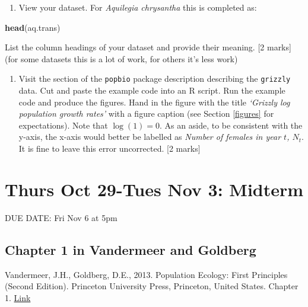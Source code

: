 \documentclass[]{book}
\newenvironment{Shaded}{\begin{snugshade}}{\end{snugshade}}
\newcommand{\KeywordTok}[1]{\textcolor[rgb]{0.13,0.29,0.53}{\textbf{{#1}}}}
\newcommand{\NormalTok}[1]{{#1}}
\providecommand{\tightlist}{%
  \setlength{\itemsep}{0pt}\setlength{\parskip}{0pt}}
\begin{document}
\begin{enumerate}
\def\labelenumi{\arabic{enumi}.}
\setcounter{enumi}{1}
\tightlist
\item
  View your dataset. For \emph{Aquilegia chrysantha} this is completed
  as:
\end{enumerate}

\begin{Shaded}
\begin{Highlighting}[]
\KeywordTok{head}\NormalTok{(aq.trans)}
\end{Highlighting}
\end{Shaded}

List the column headings of your dataset and provide their meaning. {[}2
marks{]} (for some datasets this is a lot of work, for others it's less
work)

\begin{enumerate}
\def\labelenumi{\arabic{enumi}.}
\setcounter{enumi}{2}
\tightlist
\item
  Visit the section of the \texttt{popbio} package description
  describing the \texttt{grizzly} data. Cut and paste the example code
  into an R script. Run the example code and produce the figures. Hand
  in the figure with the title \emph{`Grizzly log population growth
  rates'} with a figure caption (see Section \ref{figures} for
  expectations). Note that \(\log(1)=0\). As an aside, to be consistent
  with the y-axis, the x-axis would better be labelled as \emph{Number
  of females in year \(t\), \(N_t\)}. It is fine to leave this error
  uncorrected. {[}2 marks{]}
\end{enumerate}

\chapter{Thurs Oct 29-Tues Nov 3:
Midterm}\label{thurs-oct-29-tues-nov-3-midterm}

DUE DATE: Fri Nov 6 at 5pm

\section{Chapter 1 in Vandermeer and
Goldberg}\label{chapter-1-in-vandermeer-and-goldberg}

Vandermeer, J.H., Goldberg, D.E., 2013. Population Ecology: First
Principles (Second Edition). Princeton University Press, Princeton,
United States. Chapter 1.
\href{https://ebookcentral-proquest-com.qe2a-proxy.mun.ca/lib/mun/detail.action?docID=1205619}{Link}
\end{document}
